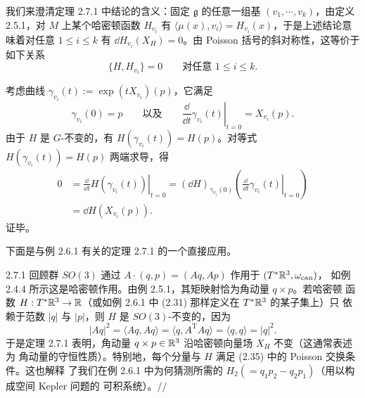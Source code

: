 我们来澄清定理 2.7.1 中结论的含义：固定 $\mathfrak{g}$ 的任意一组基
$(v_1,\cdots,v_k)$，由定义 2.5.1，对 $M$ 上某个哈密顿函数 $H_{v_i}$ 有
$\langle\mu(x),v_i\rangle=H_{v_i}(x)$，于是上述结论意味着对任意 $1\le i\le k$ 有
$\dd H_{v_i}(X_H)=0$。由 Poisson 括号的斜对称性，这等价于如下关系
\begin{equation}
  \{H,H_{v_i}\}=0\qquad\text{对任意 } 1\le i\le k .
  \tag{2.35}
\end{equation}

\begin{wproof}[定理 2.7.1 的证明]
考虑曲线 $\gamma_{v_i}(t):=\exp(tX_{v_i})(p)$，它满足
\[
  \gamma_{v_i}(0)=p
  \qquad\text{以及}\qquad
  \left.\frac{\dd}{\dd t}\gamma_{v_i}(t)\right|_{t=0}=X_{v_i}(p).
\]
由于 $H$ 是 $G$-不变的，有 $H(\gamma_{v_i}(t))=H(p)$。对等式
$H(\gamma_{v_i}(t))=H(p)$ 两端求导，得
\begin{align*}
  0&=\left.\frac{\dd}{\dd t}H(\gamma_{v_i}(t))\right|_{t=0}
  =(\dd H)_{\gamma_{v_i}(0)}\left(\left.\frac{\dd}{\dd t}\gamma_{v_i}(t)\right|_{t=0}\right)\\
  &=\dd H(X_{v_i}(p)).
\end{align*}
证毕。
\end{wproof}

下面是与例 2.6.1 有关的定理 2.7.1 的一个直接应用。

\begin{wexam}{2.7.1}
回顾群 $SO(3)$ 通过 $A\cdot(q,p)=(Aq,Ap)$ 作用于 $(T^*\mathbb{R}^3,\omega_{\mathrm{can}})$，
如例 2.4.4 所示这是哈密顿作用。由例 2.5.1，其矩映射恰为角动量 $q\times p$。若哈密顿
函数 $H:T^*\mathbb{R}^3\to\mathbb{R}$（或如例 2.6.1 中 (2.31) 那样定义在 $T^*\mathbb{R}^3$ 的某子集上）只
依赖于范数 $|q|$ 与 $|p|$，则 $H$ 是 $SO(3)$-不变的，因为
\[
  |Aq|^2=\langle Aq,Aq\rangle=\langle q,A^{\mathrm T}Aq\rangle
  =\langle q,q\rangle=|q|^2 .
\]
于是定理 2.7.1 表明，角动量 $q\times p\in\mathbb{R}^3$ 沿哈密顿向量场 $X_H$ 不变（这通常表述为
角动量的守恒性质）。特别地，每个分量与 $H$ 满足 (2.35) 中的 Poisson 交换条件。这也解释
了我们在例 2.6.1 中为何猜测所需的 $H_2(=q_1p_2-q_2p_1)$（用以构成空间 Kepler 问题的
可积系统）。\hfill$//$
\end{wexam}

